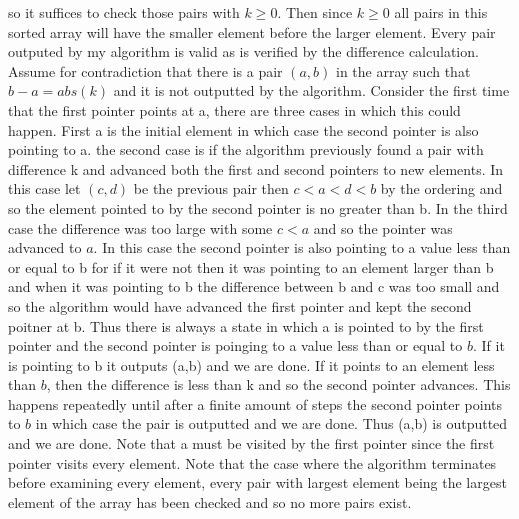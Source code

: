 \documentclass{amsart}
\begin{document}
so it suffices to check those pairs with $k \ge 0$. Then since $k \ge 0$ all pairs in this sorted array will have the smaller element before the larger element.
Every pair outputed by my algorithm is valid as is verified by the difference calculation. Assume for contradiction
that there is a pair $(a,b)$ in the array such that $b-a = abs(k)$ and  it is not outputted by the algorithm. Consider the first time that
the first pointer points at a, there are three cases in which this could happen. First a is the initial element in which case the second pointer is also pointing to a.
the second case is if the algorithm previously found a pair with difference k and advanced both the first and second pointers to new elements. In this case let  $(c,d)$ be the 
previous pair then $c < a < d < b$ by the ordering and so the element pointed to by the second pointer is no greater than b. In the third case the difference was too large with some $c < a$ and so
the pointer was advanced to $a$. In this case the second pointer is also pointing to a value less than or equal to b for if it were not then it was pointing to an element larger than b and when it was pointing to b the difference between b and c
was too small and so the algorithm would have advanced the first pointer and kept the second poitner at b. Thus there is always a state in which a is pointed to by the first pointer
and the second pointer is poinging to a value less than or equal to $b$. If it is pointing to b it outputs (a,b) and we are done.
If it points to an element less than $b$, then the difference is less than k and so the second pointer advances. This happens repeatedly until
after a finite amount of steps the second pointer points to $b$ in which case the pair is outputted and we are done. Thus (a,b) is outputted and we are done. Note that
a must be visited by the first pointer since the first pointer visits every element. Note that the case where the algorithm terminates before examining every element, every
pair with largest element being the largest element of the array has been checked and so no more pairs exist.\\
\end{document}
